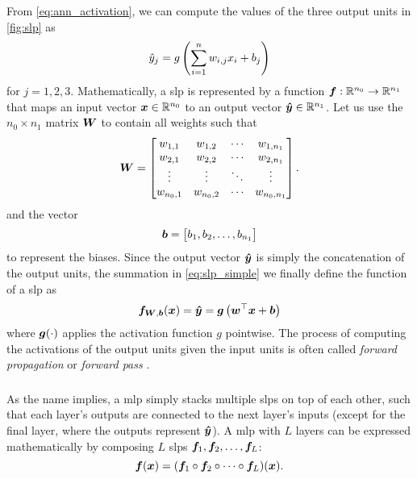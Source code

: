 \documentclass[../main.tex]{subfiles}
\begin{document}
From \cref{eq:ann_activation}, we can compute the values of the three output units in \cref{fig:slp} as
\begin{equation}
    \label{eq:slp_simple}
    \hat{y}_j = g\left(\sum_{i=1}^n{w_{i,j} x_i} + b_j\right)
\end{equation}
for $j=1,2,3$.
Mathematically, a \gls{slp} is represented by a function ${\bm{f}}:\mathbb{R}^{n_0}\to \mathbb{R}^{n_1}$ that maps an input vector ${\bm{x}} \in \mathbb{R}^{n_0}$ to an output vector ${\bm{\hat{y}}} \in \mathbb{R}^{n_1}$.
Let us use the $n_0 \times n_1$ matrix ${\bm{W}}$ to contain all weights such that
\begin{equation*}
    {\bm{W}} = \begin{bmatrix}
        w_{1,1} & w_{1,2} & \cdots & w_{1,n_1} \\ 
        w_{2,1} & w_{2,2} & \cdots & w_{2,n_1} \\ 
        \vdots & \vdots & \ddots & \vdots \\ 
        w_{n_0,1} & w_{n_0,2} & \cdots & w_{n_0,n_1} \\ 
    \end{bmatrix}.
\end{equation*}
and the vector
\begin{equation*}
    {\bm{b}} = \begin{bmatrix}
        b_1,b_2,\dots,b_{n_1}
    \end{bmatrix}
\end{equation*}
to represent the biases.
Since the output vector ${\bm{\hat{y}}}$ is simply the concatenation of the output units, the summation in \cref{eq:slp_simple} we finally define the function of a \gls{slp} as
\begin{equation}
    \label{eq:slp}
    {\bm{f}}_{{\bm{W}},{\bm{b}}}({\bm{x}}) = {\bm{\hat{y}}} = {\bm{g}}\left(
        {\bm{w}}^\top {\bm{x}} + {\bm{b}}
    \right)
\end{equation}
where ${\bm{g}}(\cdot)$ applies the activation function $g$ pointwise.
The process of computing the activations of the output units given the input units is often called \emph{forward propagation} or \emph{forward pass} \cite{burkov2019}.

\subsubsection{}
As the name implies, a \gls{mlp} simply stacks multiple \glspl{slp} on top of each other, such that each layer's outputs are connected to the next layer's inputs (except for the final layer, where the outputs represent ${\bm{\hat{y}}}$).
A \gls{mlp} with $L$ layers can be expressed mathematically by composing $L$ \glspl{slp} ${\bm{f}}_1,{\bm{f}}_2,\dots,{\bm{f}}_L$:
\begin{equation}
    \label{eq:mlp}
    {\bm{f}}({\bm{x}}) = ({\bm{f}}_1 \circ {\bm{f}}_2 \circ \dots \circ {\bm{f}}_L)({\bm{x}}).
\end{equation}
\end{document}
